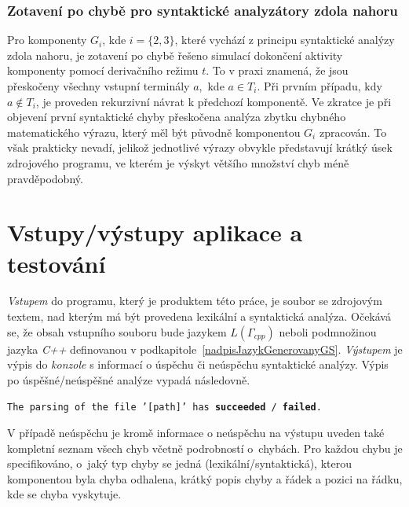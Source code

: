 \subsubsection*{Zotavení po chybě pro syntaktické analyzátory zdola nahoru}
Pro komponenty $G_i$, kde $i = \{2, 3\}$, které vychází z principu syntaktické analýzy zdola nahoru, je zotavení po chybě řešeno simulací dokončení aktivity komponenty pomocí derivačního režimu $t$. To v praxi
znamená, že jsou přeskočeny všechny vstupní terminály $a$,~kde $a \in T_i$. Při prvním případu, kdy $a \notin T_i$, je proveden rekurzivní návrat k předchozí komponentě. Ve zkratce je při objevení první syntaktické
chyby přeskočena analýza zbytku chybného matematického výrazu, který měl být původně komponentou $G_i$ zpracován. To však prakticky nevadí, jelikož jednotlivé výrazy obvykle představují krátký úsek zdrojového programu, ve kterém je výskyt většího
množství chyb méně pravděpodobný.

\section{Vstupy/výstupy aplikace a testování} \label{nadpisVstupyAVystupy}
\emph{Vstupem} do programu, který je produktem této práce, je soubor se zdrojovým textem, nad kterým má být provedena lexikální a syntaktická analýza. Očekává se, že obsah vstupního souboru bude
jazykem $L(\Gamma_{cpp})$ neboli podmnožinou jazyka \emph{C++} definovanou v podkapitole~\ref{nadpisJazykGenerovanyGS}. \emph{Výstupem} je výpis do \emph{konzole} s informací o úspěchu či neúspěchu syntaktické analýzy.
Výpis po úspěšné/neúspěšné analýze vypadá následovně.
\begin{center}
  \texttt{The parsing of the file '[path]' has \textbf{succeeded} / \textbf{failed}.}
\end{center}

V případě neúspěchu je kromě informace o neúspěchu na výstupu uveden také kompletní seznam všech chyb včetně podrobností o~chybách. Pro každou chybu je specifikováno, o~jaký typ chyby se jedná (lexikální/syntaktická),
kterou komponentou byla chyba odhalena, krátký popis chyby a řádek a pozici na řádku, kde se chyba vyskytuje.

